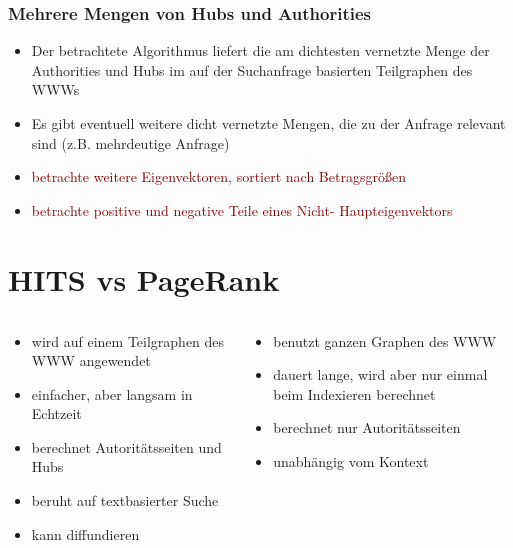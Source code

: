 \documentclass[hyperref={pdfpagelabels=false}]{beamer}
\begin{document}
\begin{frame}
\frametitle{Mehrere Mengen von Hubs und Authorities}
\begin{itemize}
\item Der betrachtete Algorithmus liefert die am dichtesten vernetzte Menge der Authorities und Hubs im auf der Suchanfrage basierten Teilgraphen des WWWs\\
\item Es gibt eventuell weitere dicht vernetzte Mengen, die zu der Anfrage relevant sind (z.B. mehrdeutige Anfrage)
\item \textcolor{maroon}{betrachte weitere Eigenvektoren, sortiert nach Betragsgrößen}
\item
\textcolor{maroon}{betrachte positive und negative Teile eines Nicht- Haupteigenvektors}
\end{itemize}

\end{frame}

\section{HITS vs PageRank}
\begin{frame}

\begin{minipage}[0.2\textheight]{\textwidth}
	\begin{columns}[T]
		\begin{column}{0.5\textwidth}
		\begin{itemize}
			\item wird auf einem Teilgraphen des WWW angewendet
			\item einfacher, aber langsam in Echtzeit
			\item berechnet Autoritätsseiten und Hubs
			\item beruht auf textbasierter Suche
			\item kann \glqq diffundieren\grqq
		\end{itemize}
		\end{column}
		
		\begin{column}{0.5\textwidth}
		\begin{itemize}
			\item benutzt ganzen Graphen des WWW
			\item dauert lange, wird aber nur einmal beim Indexieren berechnet
			\item berechnet nur Autoritätsseiten
			\item unabhängig vom Kontext
		\end{itemize}
		\end{column}
	\end{columns}
\end{minipage}


\end{frame}
\end{document}
